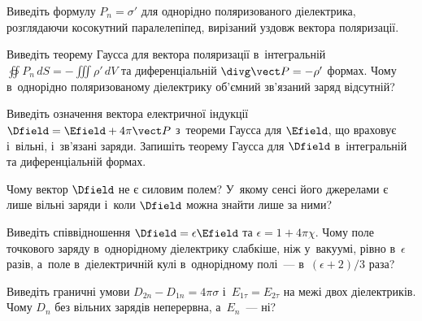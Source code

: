 \begin{Questions}
\begin{quizlist}
		\item Виведіть формулу $P_n = \sigma'$ для однорідно поляризованого діелектрика,
		розглядаючи косокутний паралелепіпед, вирізаний уздовж вектора поляризації.
		\item Виведіть теорему Гаусса для вектора поляризації в~інтегральній $\oiint P_n\,dS =
			-\iiint \rho'\,dV$ та диференціальній $\divg\vect P = -\rho'$ формах. Чому
		в~однорідно поляризованому діелектрику об'ємний зв'язаний заряд відсутній?
		\item Виведіть означення вектора електричної індукції $\Dfield = \Efield + 4\pi\vect
			P$ з~теореми Гаусса для $\Efield$, що враховує і~вільні, і~зв'язані заряди. Запишіть
		теорему Гаусса для $\Dfield$ в~інтегральній та диференціальній формах.
		\item Чому вектор $\Dfield$ не є силовим полем? У~якому сенсі його джерелами є лише
		вільні заряди і~коли $\Dfield$ можна знайти лише за ними?
		\item Виведіть співвідношення $\Dfield = \epsilon\Efield$ та $\epsilon = 1+4\pi\chi$. Чому поле точкового заряду в~однорідному діелектрику слабкіше, ніж у~вакуумі, рівно в~$\epsilon$ разів, а~поле в~діелектричній кулі в~однорідному полі~--- в~$(\epsilon+2)/3$ раза?

		\item Виведіть граничні умови $D_{2n}-D_{1n}=4\pi\sigma$ і~$E_{1\tau}=E_{2\tau}$ на межі двох діелектриків. Чому $D_n$ без вільних зарядів неперервна, а~$E_n$~--- ні?


\end{quizlist}
\end{Questions}
